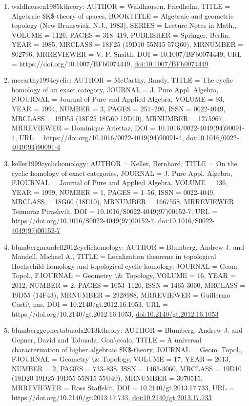 \documentclass[11pt]{article}
\begin{document}
\begin{enumerate}[leftmargin=*]
  \item waldhausen1985ktheory: AUTHOR = Waldhausen, Friedhelm, TITLE = Algebraic \$K\$-theory of spaces, BOOKTITLE = Algebraic and geometric topology (New Brunswick, N.J., 1983), SERIES = Lecture Notes in Math., VOLUME = 1126, PAGES = 318--419, PUBLISHER = Springer, Berlin, YEAR = 1985, MRCLASS = 18F25 (19D10 55N15 57Q60), MRNUMBER = 802796, MRREVIEWER = V. P. Snaith, DOI = 10.1007/BFb0074449, URL = https://doi.org/10.1007/BFb0074449, \href{https://doi.org/10.1007/BFb0074449}{doi:10.1007/BFb0074449}
  \item mccarthy1994cyclic: AUTHOR = McCarthy, Randy, TITLE = The cyclic homology of an exact category, JOURNAL = J. Pure Appl. Algebra, FJOURNAL = Journal of Pure and Applied Algebra, VOLUME = 93, YEAR = 1994, NUMBER = 3, PAGES = 251--296, ISSN = 0022-4049, MRCLASS = 19D55 (18F25 18G60 19D10), MRNUMBER = 1275967, MRREVIEWER = Dominique Arlettaz, DOI = 10.1016/0022-4049(94)90091-4, URL = https://doi.org/10.1016/0022-4049(94)90091-4, \href{https://doi.org/10.1016/0022-4049(94)90091-4}{doi:10.1016/0022-4049(94)90091-4}
  \item keller1999cyclichomology: AUTHOR = Keller, Bernhard, TITLE = On the cyclic homology of exact categories, JOURNAL = J. Pure Appl. Algebra, FJOURNAL = Journal of Pure and Applied Algebra, VOLUME = 136, YEAR = 1999, NUMBER = 1, PAGES = 1--56, ISSN = 0022-4049, MRCLASS = 18G60 (18E10), MRNUMBER = 1667558, MRREVIEWER = Teimuraz Pirashvili, DOI = 10.1016/S0022-4049(97)00152-7, URL = https://doi.org/10.1016/S0022-4049(97)00152-7, \href{https://doi.org/10.1016/S0022-4049(97)00152-7}{doi:10.1016/S0022-4049(97)00152-7}
  \item blumbergmandell2012cyclichomology: AUTHOR = Blumberg, Andrew J. and Mandell, Michael A., TITLE = Localization theorems in topological Hochschild homology and topological cyclic homology, JOURNAL = Geom. Topol., FJOURNAL = Geometry \textbackslash{}\& Topology, VOLUME = 16, YEAR = 2012, NUMBER = 2, PAGES = 1053--1120, ISSN = 1465-3060, MRCLASS = 19D55 (14F43), MRNUMBER = 2928988, MRREVIEWER = Guillermo Corti\textbackslash{} nas, DOI = 10.2140/gt.2012.16.1053, URL = https://doi.org/10.2140/gt.2012.16.1053, \href{https://doi.org/10.2140/gt.2012.16.1053}{doi:10.2140/gt.2012.16.1053}
  \item blumberggepnertabuada2013ktheory: AUTHOR = Blumberg, Andrew J. and Gepner, David and Tabuada, Gon\textbackslash{}ccalo, TITLE = A universal characterization of higher algebraic \$K\$-theory, JOURNAL = Geom. Topol., FJOURNAL = Geometry \textbackslash{}\& Topology, VOLUME = 17, YEAR = 2013, NUMBER = 2, PAGES = 733--838, ISSN = 1465-3060, MRCLASS = 19D10 (18D20 19D25 19D55 55N15 55U40), MRNUMBER = 3070515, MRREVIEWER = Ross Staffeldt, DOI = 10.2140/gt.2013.17.733, URL = https://doi.org/10.2140/gt.2013.17.733, \href{https://doi.org/10.2140/gt.2013.17.733}{doi:10.2140/gt.2013.17.733}

\end{enumerate}
\end{document}
